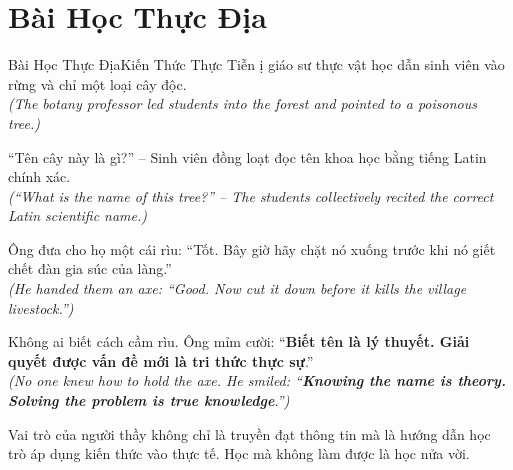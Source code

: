 \section{Bài Học Thực Địa}
\begin{truyen}{Bài Học Thực Địa}{Kiến Thức Thực Tiễn}
ị giáo sư thực vật học dẫn sinh viên vào rừng và chỉ một loại cây độc.\\
\textit{(The botany professor led students into the forest and pointed to a poisonous tree.)}

``Tên cây này là gì?'' – Sinh viên đồng loạt đọc tên khoa học bằng tiếng Latin chính xác.\\
\textit{(``What is the name of this tree?'' – The students collectively recited the correct Latin scientific name.)}

Ông đưa cho họ một cái rìu: ``Tốt. Bây giờ hãy chặt nó xuống trước khi nó giết chết đàn gia súc của làng.''\\
\textit{(He handed them an axe: ``Good. Now cut it down before it kills the village livestock.'')}

Không ai biết cách cầm rìu. Ông mỉm cười: ``\textbf{Biết tên là lý thuyết. Giải quyết được vấn đề mới là tri thức thực sự}.''\\
\textit{(No one knew how to hold the axe. He smiled: ``\textbf{Knowing the name is theory. Solving the problem is true knowledge}.'')}
\end{truyen}
\begin{baihoc}
  Vai trò của người thầy không chỉ là truyền đạt thông tin mà là hướng dẫn học trò áp dụng kiến thức vào thực tế. Học mà không làm được là học nửa vời.
\end{baihoc}


